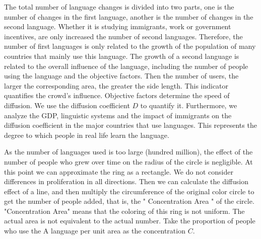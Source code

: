 \documentclass{mcmthesis}
\begin{document}
    The total number of language changes is divided into two parts, one is the number of changes in the first language, another is the number of changes in the second language.
    Whether it is studying immigrants, work or government incentives, are only increased the number of second languages.
    Therefore, the number of first languages is only related to the growth of the population of many countries that mainly use this language.
    The growth of a second language is related to the overall influence of the language, including the number of people using the language and the objective factors.
    Then the number of users, the larger the corresponding area, the greater the side length.
    This indicator quantifies the crowd's influence.
    Objective factors determine the speed of diffusion.
    We use the diffusion coefficient $D$ to quantify it.
    Furthermore, we analyze the GDP, linguistic systems and the impact of immigrants on the diffusion coefficient in the major countries that use languages.
    This represents the degree to which people in real life learn the language.

    As the number of languages used is too large (hundred million),
    the effect of the number of people who grew over time on the radius of the circle is negligible.
    At this point we can approximate the ring as a rectangle.
    We do not consider differences in proliferation in all directions.
    Then we can calculate the diffusion effect of a line,
    and then multiply the circumference of the original color circle
    to get the number of people added, that is, the " Concentration Area " of the circle.
    "Concentration Area" means that the coloring of this ring is not uniform.
    The actual area is not equivalent to the actual number.
    Take the proportion of people who use the A language per unit area as the concentration $C$.
\end{document}
